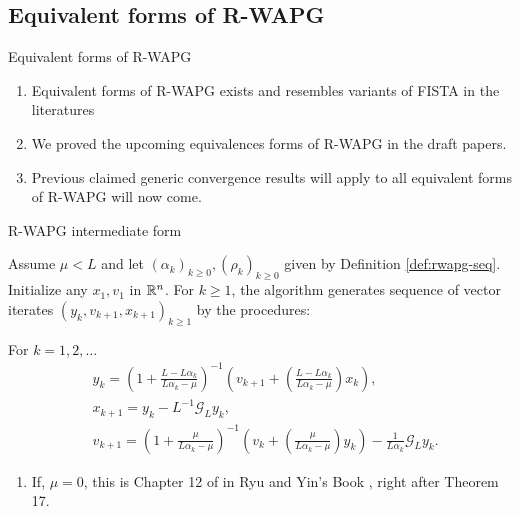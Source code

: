 \documentclass[11pt]{beamer}
\theoremstyle{definition}
\begin{document}
    \subsection{Equivalent forms of R-WAPG}
        \begin{frame}{Equivalent forms of R-WAPG}
            \begin{enumerate}
                \item Equivalent forms of R-WAPG exists and resembles variants of FISTA in the literatures
                \item We proved the upcoming equivalences forms of R-WAPG in the draft papers. 
                \item Previous claimed generic convergence results will apply to all equivalent forms of R-WAPG will now come. 
            \end{enumerate}    
        \end{frame}
        \begin{frame}{R-WAPG intermediate form}
            \begin{definition}\label{def:r-wapg-intermediate}
                Assume $\mu < L$ and let $(\alpha_k)_{k \ge 0}, (\rho_k)_{k \ge 0}$ given by Definition \ref{def:rwapg-seq}. 
                Initialize any $x_1, v_1$ in $\mathbb R^n$. 
                For $k \ge 1$, the algorithm generates sequence of vector iterates $(y_{k}, v_{k + 1}, x_{k + 1})_{k \ge 1}$ by the procedures: 
                {\small
                \begin{tcolorbox}
                    For $k = 1, 2, \ldots$
                    \begin{align*} 
                        & y_{k} = 
                        \left(
                            1 + \frac{L - L\alpha_{k}}{L\alpha_{k} - \mu}
                        \right)^{-1}
                        \left(
                            v_{k + 1} + 
                            \left(\frac{L - L\alpha_{k}}{L\alpha_{k} - \mu} \right) x_{k}
                        \right), 
                        \\
                        & x_{k + 1} = 
                        y_k - L^{-1} \mathcal G_L y_k, 
                        \\
                        & v_{k + 1} = 
                        \left(
                            1 + \frac{\mu}{L \alpha_k - \mu}
                        \right)^{-1}
                        \left(
                            v_k + 
                            \left(\frac{\mu}{L \alpha_k - \mu}\right) y_k
                        \right) - \frac{1}{L\alpha_{k}}\mathcal G_L y_k. 
                    \end{align*}
                \end{tcolorbox}
                }
            \end{definition}
            \pause
            \begin{enumerate}
                \item If, $\mu = 0$, this is Chapter 12 of in Ryu and Yin's Book \cite{ryu_large-scale_2022}, right after Theorem 17.
            \end{enumerate}
        \end{frame}
\end{document}
